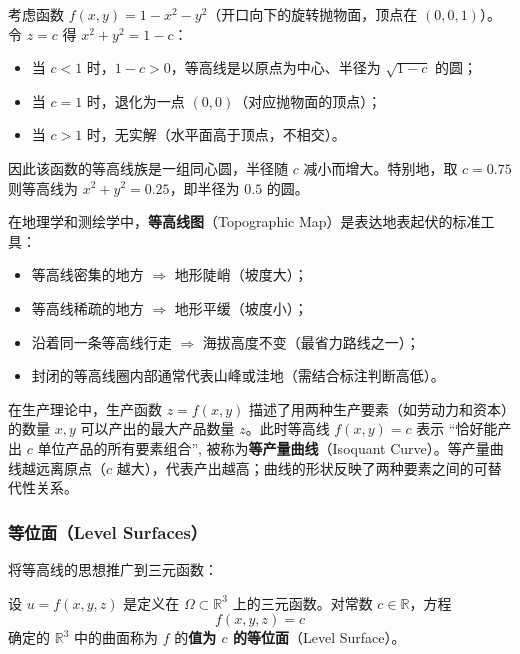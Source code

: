 \documentclass[lang=cn,11pt]{elegantbook}
\begin{document}
\begin{exercise}[旋转抛物面的等高线]
考虑函数 $f(x,y)=1-x^2-y^2$（开口向下的旋转抛物面，顶点在 $(0,0,1)$）。令 $z=c$ 得 $x^2+y^2=1-c$：
\begin{itemize}
  \item 当 $c<1$ 时，$1-c>0$，等高线是以原点为中心、半径为 $\sqrt{1-c}$ 的圆；
  \item 当 $c=1$ 时，退化为一点 $(0,0)$（对应抛物面的顶点）；
  \item 当 $c>1$ 时，无实解（水平面高于顶点，不相交）。
\end{itemize}
因此该函数的等高线族是一组同心圆，半径随 $c$ 减小而增大。特别地，取 $c=0.75$ 则等高线为 $x^2+y^2=0.25$，即半径为 $0.5$ 的圆。
\end{exercise}

\begin{exercise}[地形图的等高线解读] \label{ex:topo-map}
在地理学和测绘学中，\textbf{等高线图}（Topographic Map）是表达地表起伏的标准工具：
\begin{itemize}
  \item 等高线密集的地方 $\Rightarrow$ 地形陡峭（坡度大）；
  \item 等高线稀疏的地方 $\Rightarrow$ 地形平缓（坡度小）；
  \item 沿着同一条等高线行走 $\Rightarrow$ 海拔高度不变（最省力路线之一）；
  \item 封闭的等高线圈内部通常代表山峰或洼地（需结合标注判断高低）。
\end{itemize}
\end{exercise}

\begin{exercise}[经济学中的等产量曲线]
在生产理论中，生产函数 $z=f(x,y)$ 描述了用两种生产要素（如劳动力和资本）的数量 $x,y$ 可以产出的最大产品数量 $z$。此时等高线 $f(x,y)=c$ 表示 ``恰好能产出 $c$ 单位产品的所有要素组合'', 被称为\textbf{等产量曲线}（Isoquant Curve）。等产量曲线越远离原点（$c$ 越大），代表产出越高；曲线的形状反映了两种要素之间的可替代性关系。
\end{exercise}


\subsubsection*{等位面（Level Surfaces）}

将等高线的思想推广到三元函数：

\begin{definition} \label{def:level-surface}
设 $u=f(x,y,z)$ 是定义在 $\Omega\subset\mathbb{R}^3$ 上的三元函数。对常数 $c\in\mathbb{R}$，方程
\[
f(x,y,z)=c
\]
确定的 $\mathbb{R}^3$ 中的曲面称为 $f$ 的\textbf{值为 $c$ 的等位面}（Level Surface）。
\end{definition}
\end{document}
